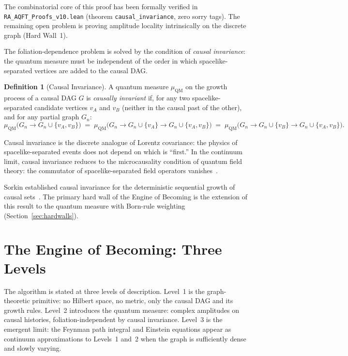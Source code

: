 \documentclass[11pt,a4paper]{article}
\theoremstyle{plain}
\theoremstyle{definition}
\newtheorem{definition}[theorem]{Definition}
\theoremstyle{remark}
\newcommand{\muC}{\mu_{\mathrm{QM}}}   %
\begin{document}
\noindent The combinatorial core of this proof has been formally verified in
\texttt{RA\_AQFT\_Proofs\_v10.lean} (theorem \texttt{causal\_invariance},
zero sorry tags). The remaining open problem is proving amplitude locality
intrinsically on the discrete graph (Hard Wall~1).



The foliation-dependence problem is solved by the condition of \emph{causal
invariance}: the quantum measure must be independent of the order in which
spacelike-separated vertices are added to the causal DAG.

\begin{definition}[Causal Invariance]
A quantum measure $\muC$ on the growth process of a causal DAG $G$ is
\emph{causally invariant} if, for any two spacelike-separated candidate
vertices $v_A$ and $v_B$ (neither in the causal past of the other), and
for any partial graph $G_n$:
\begin{equation}
  \muC\bigl(G_n \to G_n \cup \{v_A, v_B\}\bigr)
  \;=\;
  \muC\bigl(G_n \to G_n \cup \{v_A\} \to G_n \cup \{v_A, v_B\}\bigr)
  \;=\;
  \muC\bigl(G_n \to G_n \cup \{v_B\} \to G_n \cup \{v_A, v_B\}\bigr).
  \label{eq:causal_invariance}
\end{equation}
\end{definition}

Causal invariance is the discrete analogue of Lorentz covariance: the physics
of spacelike-separated events does not depend on which is ``first.'' In the
continuum limit, causal invariance reduces to the microcausality condition of
quantum field theory: the commutator of spacelike-separated field operators
vanishes~\citep{Haag1996}.

Sorkin established causal invariance for the deterministic sequential growth
of causal sets~\citep{RideoutSorkin2000}. The primary hard wall of the Engine
of Becoming is the extension of this result to the quantum measure with
Born-rule weighting (Section~\ref{sec:hardwalls}).

\section{The Engine of Becoming: Three Levels}
\label{sec:algorithm}

The algorithm is stated at three levels of description. Level~1 is the
graph-theoretic primitive: no Hilbert space, no metric, only the causal DAG
and its growth rules. Level~2 introduces the quantum measure: complex amplitudes
on causal histories, foliation-independent by causal invariance. Level~3 is
the emergent limit: the Feynman path integral and Einstein equations appear
as continuum approximations to Levels~1 and~2 when the graph is sufficiently
dense and slowly varying.
\end{document}

